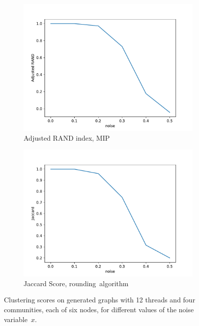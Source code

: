 \begin{figure}
	\begin{center}
		\begin{subfigure}[t]{0.4\textwidth}
			\centering
			\includegraphics[width=\textwidth]{tex/out/synthetic_exact/model2_noise_adj_rand.pdf}
			\caption{Adjusted RAND index, MIP}
			\label{fig:tex/out/synthetic_exact/model2_noise_adj_rand.pdf}
		\end{subfigure}
		\quad
		\begin{subfigure}[t]{0.4\textwidth}
			\centering
			\includegraphics[width=\textwidth]{tex/out/synthetic_exact/model2_noise_jaccard.pdf}
			\caption{Jaccard Score, \mbox{rounding algorithm}}
			\label{fig:tex/out/synthetic_exact/_noise_jaccard.pdf}
		\end{subfigure}
	\end{center}
	\caption{Clustering scores on generated graphs with 12 threads and four communities, each
		of six nodes, for different values of the noise
		variable~$x$.}
	\label{fig:clustering-mip-rounding}
\end{figure}

